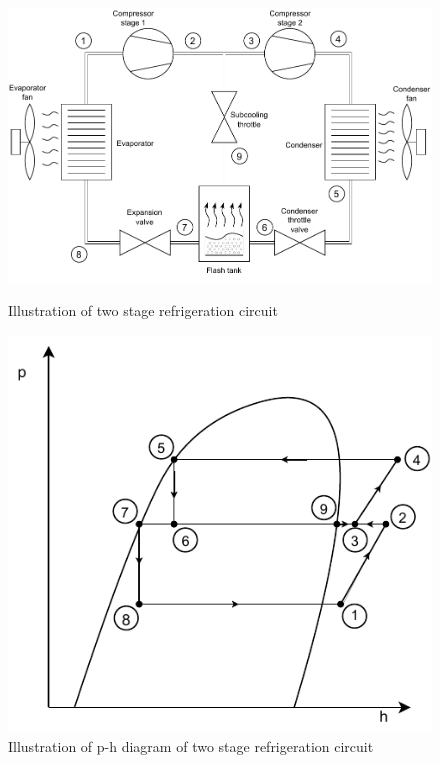 \begin{figure}[h]
	\centering
	\begin{minipage}{0.6\textwidth}
		\centering
		\includegraphics[width=1\textwidth]{Graphics/HVAC_Diagram_Fans.pdf} %
		\caption{Illustration of two stage refrigeration circuit}
		\label{fig:HVAC_Diagram}
	\end{minipage}\hfill
	\begin{minipage}{0.4\textwidth}
		\centering
		\includegraphics[width=1.05\textwidth]{Graphics/Flash_Tank_P-h_Diagram} %
		\caption{Illustration of p-h diagram of two stage refrigeration circuit}
		\label{fig:p-h_diagram}
	\end{minipage}
\end{figure}

